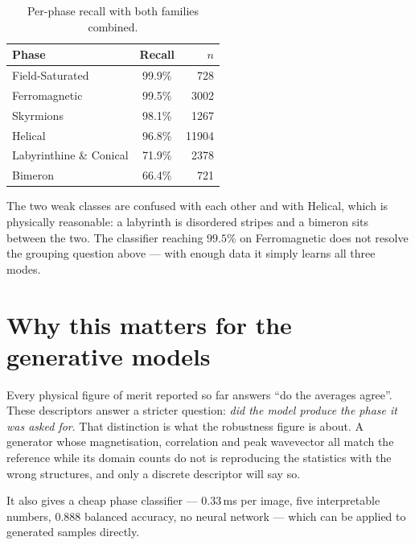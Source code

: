 \documentclass[11pt,a4paper]{article}
\newcommand{\warn}[1]{\textcolor{red!70!black}{#1}}
\begin{document}
\begin{table}[H]
\centering\small
\caption{Per-phase recall with both families combined.}
\begin{tabular}{lcr}
\toprule
Phase & Recall & $n$ \\
\midrule
Field-Saturated         & 99.9\% & 728 \\
Ferromagnetic           & 99.5\% & 3002 \\
Skyrmions               & 98.1\% & 1267 \\
Helical                 & 96.8\% & 11904 \\
Labyrinthine \& Conical & \warn{71.9\%} & 2378 \\
Bimeron                 & \warn{66.4\%} & 721 \\
\bottomrule
\end{tabular}
\end{table}

The two weak classes are confused with each other and with Helical, which is physically
reasonable: a labyrinth is disordered stripes and a bimeron sits between the two. The
classifier reaching $99.5\%$ on Ferromagnetic does not resolve the grouping question above
--- with enough data it simply learns all three modes.

\section{Why this matters for the generative models}

Every physical figure of merit reported so far answers ``do the averages agree''. These
descriptors answer a stricter question: \emph{did the model produce the phase it was asked
for}. That distinction is what the robustness figure is about. A generator whose
magnetisation, correlation and peak wavevector all match the reference while its domain
counts do not is reproducing the statistics with the wrong structures, and only a discrete
descriptor will say so.

It also gives a cheap phase classifier --- $0.33$\,ms per image, five interpretable numbers,
$0.888$ balanced accuracy, no neural network --- which can be applied to generated samples
directly.
\end{document}
